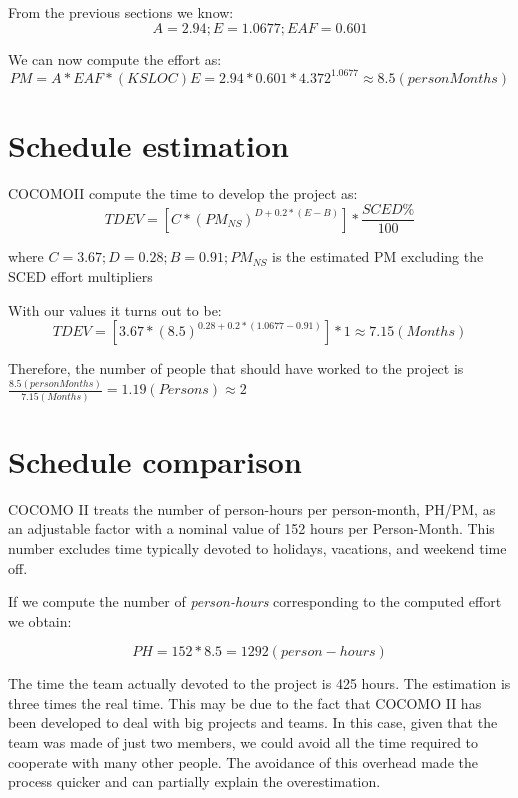 \documentclass[10pt,a4paper,titlepage]{article}
\begin{document}
From the previous sections we know:
\[A=2.94; E=1.0677; EAF=0.601\]

We can now compute the effort as:
\[PM = A * EAF * (KSLOC)E = 2.94 * 0.601 * 4.372^{1.0677} \approx 8.5 (personMonths)\]

\section{Schedule estimation}
COCOMOII compute the time to develop the project as:
\[TDEV = [C * (PM_{NS})^{D+0.2*(E-B)}] * \frac{SCED\%}{100} \]
\begin{center}
where $C=3.67; D=0.28; B=0.91; PM_{NS}$ is the estimated PM excluding the SCED effort multipliers
\end{center}

With our values it turns out to be:
\[TDEV = [3.67 * (8.5)^{0.28+0.2*(1.0677-0.91)}]*1 \approx 7.15 (Months)\]

Therefore, the number of people that should have worked to the project is $\frac{8.5 (personMonths)}{7.15 (Months)} = 1.19 (Persons) \approx 2$

\section{Schedule comparison}
COCOMO II treats the number of person-hours per person-month, PH/PM, as an adjustable factor with a nominal value of 152 hours per Person-Month. This number excludes time typically devoted to holidays, vacations, and weekend time off.

If we compute the number of \textit{person-hours} corresponding to the computed effort we obtain:

\[PH = 152 * 8.5 = 1292(person-hours)\]

The time the team actually devoted to the project is 425 hours.
The estimation is three times the real time. This may be due to the fact that COCOMO II has been developed to deal with big projects and teams. In this case, given that the team was made of just two members, we could avoid all the time required to cooperate with many other people. The avoidance of this overhead made the process quicker and can partially explain the overestimation.
\end{document}
